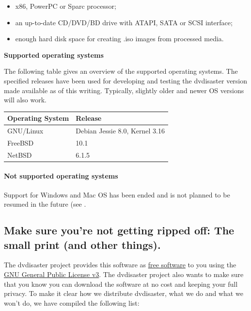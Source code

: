 \begin{itemize}
\item x86, PowerPC or Sparc processor;
\item an up-to-date CD/DVD/BD drive with ATAPI, SATA or SCSI interface;
\item enough hard disk space for creating .iso images from processed media.
\end{itemize}

\bigskip

{\bf Supported operating systems}\quad

\medskip

The following table gives an overview of the supported operating systems.
The specified releases have been used for developing and testing the
dvdisaster version made available as of this writing. 
Typically, slightly older and newer OS versions will also work.
\label{download-requirements-freebsd}

\bigskip

\begin{tabular}{|l|l|}
\hline
Operating System & Release \\
\hline
GNU/Linux & Debian Jessie 8.0,  Kernel 3.16 \\
\hline
FreeBSD & 10.1 \\
\hline
NetBSD & 6.1.5 \\
\hline
\end{tabular}

\bigskip

\paragraph{Not supported operating systems}\quad

\medskip

Support for Windows and Mac OS has been ended
and is not planned to be resumed in the
future (see . 

\newpage
\subsection{Make sure you're not getting ripped off: The small print (and other things).}
\label{download-terms}

The dvdisaster project provides this software
as \href{http://fsfe.org/about/basics/freesoftware.en.html}{free software} to you using
the \href{http://www.gnu.org/licenses/gpl-3.0.txt}{GNU General Public License v3}.
The dvdisaster project also wants to make sure that you know you can download
the software at no cost and keeping your full privacy.
To make it clear how we distribute dvdisaster, what we do and what we
won't do, we have compiled the following list:

